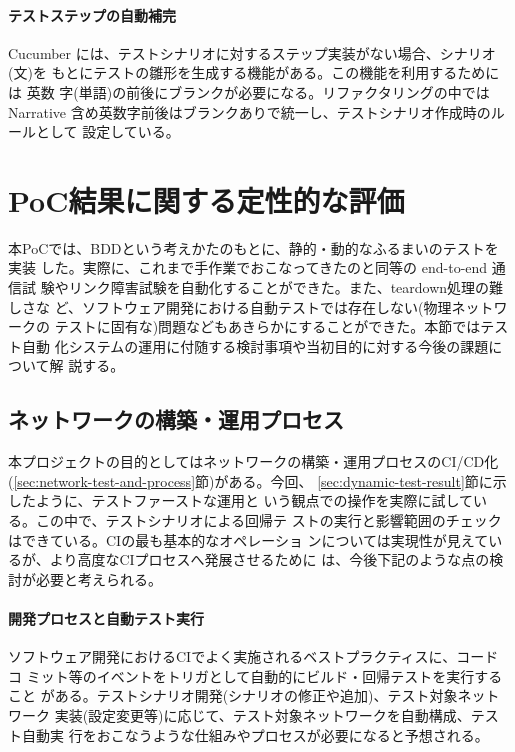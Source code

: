 \paragraph{テストステップの自動補完}

Cucumber には、テストシナリオに対するステップ実装がない場合、シナリオ(文)を
もとにテストの雛形を生成する機能がある。この機能を利用するためには 英数
字(単語)の前後にブランクが必要になる。リファクタリングの中ではNarrative
含め英数字前後はブランクありで統一し、テストシナリオ作成時のルールとして
設定している。

\section{PoC結果に関する定性的な評価}

本PoCでは、BDDという考えかたのもとに、静的・動的なふるまいのテストを実装
した。実際に、これまで手作業でおこなってきたのと同等の end-to-end 通信試
験やリンク障害試験を自動化することができた。また、teardown処理の難しさな
ど、ソフトウェア開発における自動テストでは存在しない(物理ネットワークの
テストに固有な)問題などもあきらかにすることができた。本節ではテスト自動
化システムの運用に付随する検討事項や当初目的に対する今後の課題について解
説する。

  \subsection{ネットワークの構築・運用プロセス}

本プロジェクトの目的としてはネットワークの構築・運用プロセスのCI/CD化
(\ref{sec:network-test-and-process}節)がある。今回、
\ref{sec:dynamic-test-result}節に示したように、テストファーストな運用と
いう観点での操作を実際に試している。この中で、テストシナリオによる回帰テ
ストの実行と影響範囲のチェックはできている。CIの最も基本的なオペレーショ
ンについては実現性が見えているが、より高度なCIプロセスへ発展させるために
は、今後下記のような点の検討が必要と考えられる。

    \paragraph{開発プロセスと自動テスト実行}
ソフトウェア開発におけるCIでよく実施されるベストプラクティスに、コードコ
ミット等のイベントをトリガとして自動的にビルド・回帰テストを実行すること
がある。テストシナリオ開発(シナリオの修正や追加)、テスト対象ネットワーク
実装(設定変更等)に応じて、テスト対象ネットワークを自動構成、テスト自動実
行をおこなうような仕組みやプロセスが必要になると予想される。

